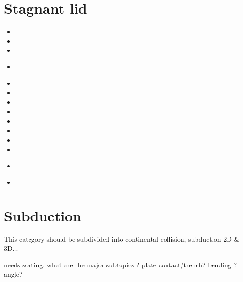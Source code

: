 \section{Stagnant lid} 

\begin{scriptsize}
\begin{itemize}
\item[\nineteenninetysix] 
\item[\nineteenninetyseven] 
\item[\nineteenninetyeight] 
\item[\nineteenninetynine] 
  \\ 
\item[\twothousand] 
\item[\twothousandtwo] 
\item[\twothousandfour] 
\item[\twothousandfive] 
\item[\twothousandnine] 
\item[\twothousandten] 
\item[\twothousandeleven] 
\item[\twothousandfourteen] 
\item[\twothousandsixteen] 
 \\ 
\item[\twothousandseventeen] 
\end{itemize}
\end{scriptsize}


\section{Subduction} 
This category should be subdivided into continental collision, subduction 2D \& 3D...

{\color{red} needs sorting: what are the major subtopics ? plate contact/trench? bending ? 
angle? } 


